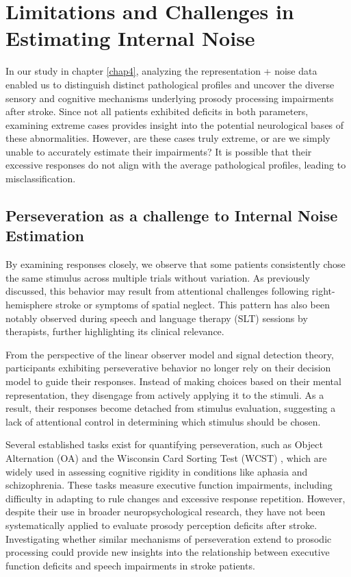 \renewcommand{\chaptername}{Chapter} 
\chapter{Limitations and Challenges in Estimating Internal Noise}\label{chap5}

In our study in chapter \ref{chap4}, analyzing the representation + noise data enabled us to distinguish distinct pathological profiles and uncover the diverse sensory and cognitive mechanisms underlying prosody processing impairments after stroke. Since not all patients exhibited deficits in both parameters, examining extreme cases provides insight into the potential neurological bases of these abnormalities. However, are these cases truly extreme, or are we simply unable to accurately estimate their impairments? It is possible that their excessive responses do not align with the average pathological profiles, leading to misclassification. 

\section {Perseveration as a challenge to Internal Noise Estimation} 

By examining responses closely, we observe that some patients consistently chose the same stimulus across multiple trials without variation. As previously discussed, this behavior may result from attentional challenges following right-hemisphere stroke or symptoms of spatial neglect. This pattern has also been notably observed during speech and language therapy (SLT) sessions by therapists, further highlighting its clinical relevance. 

From the perspective of the linear observer model and signal detection theory, participants exhibiting perseverative behavior no longer rely on their decision model to guide their responses. Instead of making choices based on their mental representation, they disengage from actively applying it to the stimuli. As a result, their responses become detached from stimulus evaluation, suggesting a lack of attentional control in determining which stimulus should be chosen.

Several established tasks exist for quantifying perseveration, such as Object Alternation (OA) \cite{freedman_orbitofrontal_1998} and the Wisconsin Card Sorting Test (WCST) \cite{abbruzzese_performance_1996}, which are widely used in assessing cognitive rigidity in conditions like aphasia and schizophrenia. These tasks measure executive function impairments, including difficulty in adapting to rule changes and excessive response repetition. However, despite their use in broader neuropsychological research, they have not been systematically applied to evaluate prosody perception deficits after stroke. Investigating whether similar mechanisms of perseveration extend to prosodic processing could provide new insights into the relationship between executive function deficits and speech impairments in stroke patients.


